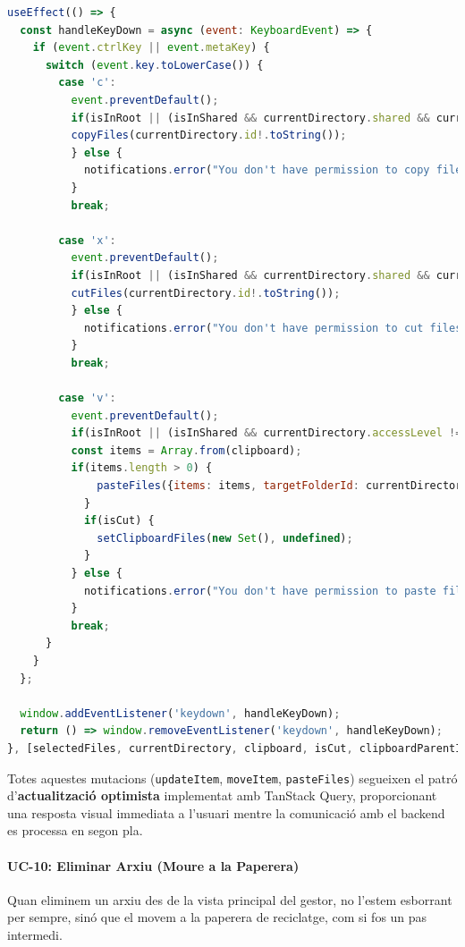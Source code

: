 \begin{lstlisting}[language=javascript, caption={Gestió de dreceres de teclat a `useFileShortcuts.ts`}]
useEffect(() => {
  const handleKeyDown = async (event: KeyboardEvent) => {
    if (event.ctrlKey || event.metaKey) {
      switch (event.key.toLowerCase()) {
        case 'c':
          event.preventDefault();
          if(isInRoot || (isInShared && currentDirectory.shared && currentDirectory.accessLevel !== 'READ')) {
          copyFiles(currentDirectory.id!.toString());
          } else {
            notifications.error("You don't have permission to copy files");
          }
          break;

        case 'x':
          event.preventDefault();
          if(isInRoot || (isInShared && currentDirectory.shared && currentDirectory.accessLevel !== 'read')) {
          cutFiles(currentDirectory.id!.toString());
          } else {
            notifications.error("You don't have permission to cut files");
          }
          break;

        case 'v':
          event.preventDefault();
          if(isInRoot || (isInShared && currentDirectory.accessLevel !== 'read')) {
          const items = Array.from(clipboard);
          if(items.length > 0) {
              pasteFiles({items: items, targetFolderId: currentDirectory.id!.toString(), prevParentId: clipboardParentId, isCut: isCut});
            }
            if(isCut) {
              setClipboardFiles(new Set(), undefined);
            }
          } else {
            notifications.error("You don't have permission to paste files");
          }
          break;
      }
    }
  };

  window.addEventListener('keydown', handleKeyDown);
  return () => window.removeEventListener('keydown', handleKeyDown);
}, [selectedFiles, currentDirectory, clipboard, isCut, clipboardParentId, /* ... */]);
\end{lstlisting}

Totes aquestes mutacions (\texttt{updateItem}, \texttt{moveItem}, \texttt{pasteFiles}) segueixen el patró d'\textbf{actualització optimista} implementat amb TanStack Query, proporcionant una resposta visual immediata a l'usuari mentre la comunicació amb el backend es processa en segon pla. 

\paragraph{UC-10: Eliminar Arxiu (Moure a la Paperera)}
Quan eliminem un arxiu des de la vista principal del gestor, no l'estem esborrant per sempre, sinó que el movem a la paperera de reciclatge, com si fos un pas intermedi.

